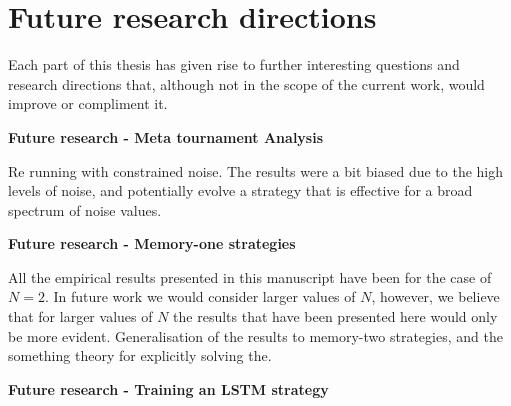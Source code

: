 \section{Future research directions}

Each part of this thesis has given rise to further interesting questions and
research directions that, although not in the scope of the current work, would
improve or compliment it.

\textbf{Future research - Meta tournament Analysis}

Re running with constrained noise. The results were a bit biased due to
the high levels of noise, and potentially evolve a strategy that is effective
for a broad spectrum of noise values.

\textbf{Future research - Memory-one strategies}

All the empirical results presented in this manuscript have been for the
case of $N=2$. In future work we would consider larger values of $N$, however, we
believe that for larger values of $N$ the results that have been presented here would
only be more evident. Generalisation of the results to memory-two strategies, and
the something theory for explicitly solving the.

\textbf{Future research - Training an LSTM strategy}


